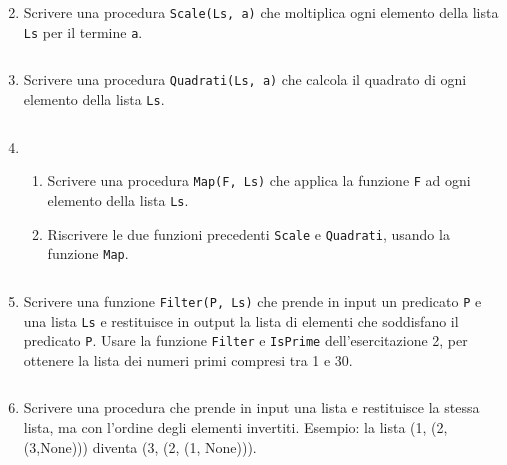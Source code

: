 \documentclass[11pt,a4]{article}
\newcommand{\mybox}[2]{$\quad$\fbox{
\begin{minipage}{#1cm}
\hfill\vspace{#2cm}
\end{minipage}
}}
\begin{document}
\begin{enumerate}
\mybox{15}{2.0}

\item Scrivere una procedura {\tt Scale(Ls, a)} che moltiplica ogni elemento della lista {\tt Ls} per il termine {\tt a}.

\mybox{15}{1.5}

\item Scrivere una procedura {\tt Quadrati(Ls, a)} che calcola il quadrato di ogni elemento della lista {\tt Ls}.

\mybox{15}{1.5}

\item 
\begin{enumerate}
\item Scrivere una procedura {\tt Map(F, Ls)} che applica la funzione {\tt F} ad ogni elemento della lista {\tt Ls}.
\item Riscrivere le due funzioni precedenti {\tt Scale} e {\tt Quadrati}, usando la funzione {\tt Map}.
\end{enumerate}

\mybox{15}{2.5}

\item Scrivere una funzione {\tt Filter(P, Ls)} che prende in input un predicato {\tt P} e una lista {\tt Ls}
e restituisce in output la lista di elementi che soddisfano il predicato {\tt P}. Usare la funzione {\tt Filter}
e {\tt IsPrime} dell'esercitazione 2, per ottenere la lista dei numeri primi compresi tra 1 e 30.


\mybox{15}{2.5}

\item Scrivere una procedura che prende in input una lista e restituisce la stessa lista, ma con l'ordine degli elementi invertiti. 
Esempio: la lista (1, (2, (3,None))) diventa (3, (2, (1, None))).

\mybox{15}{2.5}
\end{enumerate}
\end{document}
